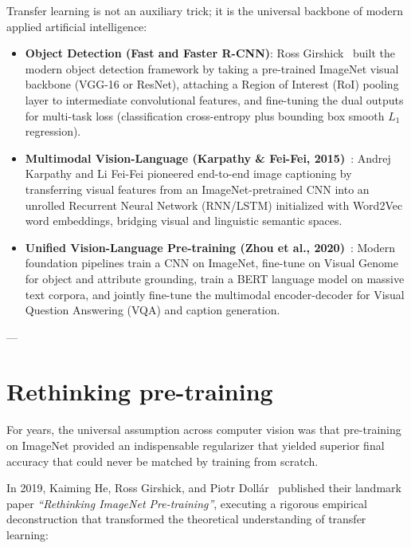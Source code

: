 Transfer learning is not an auxiliary trick; it is the universal backbone of modern applied artificial intelligence:
\begin{itemize}[leftmargin=*]
  \item \textbf{Object Detection (Fast and Faster R-CNN)}: Ross Girshick~\cite{girshick2015fast} built the modern object detection framework by taking a pre-trained ImageNet visual backbone (VGG-16 or ResNet), attaching a Region of Interest (RoI) pooling layer to intermediate convolutional features, and fine-tuning the dual outputs for multi-task loss (classification cross-entropy plus bounding box smooth $L_1$ regression).
  \item \textbf{Multimodal Vision-Language (Karpathy \& Fei-Fei, 2015)}~\cite{karpathy2015deep}: Andrej Karpathy and Li Fei-Fei pioneered end-to-end image captioning by transferring visual features from an ImageNet-pretrained CNN into an unrolled Recurrent Neural Network (RNN/LSTM) initialized with Word2Vec word embeddings, bridging visual and linguistic semantic spaces.
  \item \textbf{Unified Vision-Language Pre-training (Zhou et al., 2020)}~\cite{zhou2020unified}: Modern foundation pipelines train a CNN on ImageNet, fine-tune on Visual Genome for object and attribute grounding, train a BERT language model on massive text corpora, and jointly fine-tune the multimodal encoder-decoder for Visual Question Answering (VQA) and caption generation.
\end{itemize}

---

\section{Rethinking pre-training}
\label{sec:rethinking_pretraining}

For years, the universal assumption across computer vision was that pre-training on ImageNet provided an indispensable regularizer that yielded superior final accuracy that could never be matched by training from scratch.

In 2019, Kaiming He, Ross Girshick, and Piotr Dollár~\cite{he2019rethinking} published their landmark paper \textit{``Rethinking ImageNet Pre-training''}, executing a rigorous empirical deconstruction that transformed the theoretical understanding of transfer learning:

